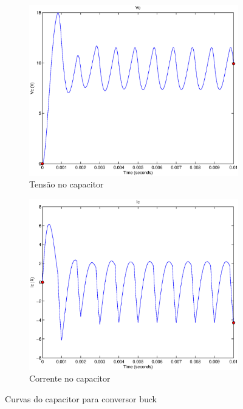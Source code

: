 \documentclass{article}
\begin{document}
\begin{figure}[H]
	\centering
	\begin{subfigure}[b]{0.4\linewidth}
		\includegraphics[width=\linewidth]{matlab/buck/b_vc}
		\caption{Tensão no capacitor}
	\end{subfigure}
	\begin{subfigure}[b]{0.4\linewidth}
		\centering
		\includegraphics[width=\linewidth]{matlab/buck/b_ic}
		\caption{Corrente no capacitor}
	\end{subfigure}
	\caption{Curvas do capacitor para conversor buck}
	\label{fig:bc}
\end{figure}
\end{document}
